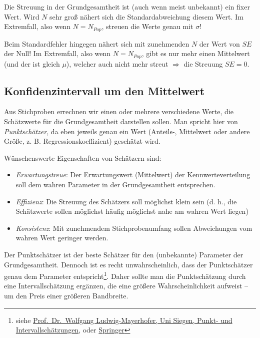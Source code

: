 \documentclass[]{article}
\providecommand{\tightlist}{%
  \setlength{\itemsep}{0pt}\setlength{\parskip}{0pt}}
\let\rmarkdownfootnote\footnote%
\def\footnote{\protect\rmarkdownfootnote}
\begin{document}
Die Streuung in der Grundgesamtheit ist (auch wenn meist unbekannt) ein
fixer Wert. Wird \(N\) sehr groß nähert sich die Standardabweichung
diesem Wert. Im Extremfall, also wenn \(N = N_{Pop}\), streuen die Werte
genau mit \(\sigma\)!

Beim Standardfehler hingegen nähert sich mit zunehmenden \(N\) der Wert
von \(SE\) der Null! Im Extremfall, also wenn \(N = N_{Pop}\), gibt es
nur mehr einen Mittelwert (und der ist gleich \(\mu\)), welcher auch
nicht mehr streut \(\Rightarrow\) die Streuung \(SE = 0\).

\subsection*{Konfidenzintervall um den
Mittelwert}\label{konfidenzintervall-um-den-mittelwert}

Aus Stichproben errechnen wir einen oder mehrere verschiedene Werte, die
Schätzwerte für die Grundgesamtheit darstellen sollen. Man spricht hier
von \emph{Punktschätzer}, da eben jeweils genau ein Wert (Anteils-,
Mittelwert oder andere Größe, z. B. Regressionskoeffizient) geschätzt
wird.

Wünschenswerte Eigenschaften von Schätzern sind:

\begin{itemize}
\tightlist
\item
  \emph{Erwartungstreue}: Der Erwartungswert (Mittelwert) der
  Kennwerteverteilung soll dem wahren Parameter in der Grundgesamtheit
  entsprechen.
\item
  \emph{Effizienz}: Die Streuung des Schätzers soll möglichst klein sein
  (d. h., die Schätzwerte sollen möglichst häufig möglichst nahe am
  wahren Wert liegen)
\item
  \emph{Konsistenz}: Mit zunehmendem Stichprobenumfang sollen
  Abweichungen vom wahren Wert geringer werden.
\end{itemize}

Der Punktschätzer ist der beste Schätzer für den (unbekannte) Parameter
der Grundgesamtheit. Dennoch ist es recht unwahrscheinlich, dass der
Punktschätzer genau dem Parameter entspricht\footnote{siehe
  \href{https://www.uni-siegen.de/phil/sozialwissenschaften/soziologie/mitarbeiter/ludwig-mayerhofer/statistik/statistik_downloads/statistik_ii_4.pdf}{Prof.~Dr.~Wolfgang
  Ludwig-Mayerhofer, Uni Siegen, Punkt- und Intervallschätzungen}, oder
  \href{https://link.springer.com/content/pdf/10.1007/978-3-642-41995-9_8.pdf}{Springer}}.
Daher sollte man die Punktschätzung durch eine Intervallschätzung
ergänzen, die eine größere Wahrscheinlichkeit aufweist -- um den Preis
einer größeren Bandbreite.
\end{document}
